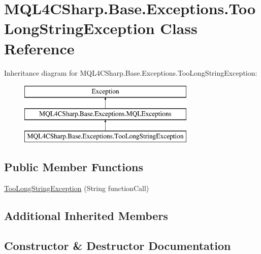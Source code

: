 \hypertarget{class_m_q_l4_c_sharp_1_1_base_1_1_exceptions_1_1_too_long_string_exception}{}\section{M\+Q\+L4\+C\+Sharp.\+Base.\+Exceptions.\+Too\+Long\+String\+Exception Class Reference}
\label{class_m_q_l4_c_sharp_1_1_base_1_1_exceptions_1_1_too_long_string_exception}
Inheritance diagram for M\+Q\+L4\+C\+Sharp.\+Base.\+Exceptions.\+Too\+Long\+String\+Exception\+:\begin{figure}[H]
\begin{center}
\leavevmode
\includegraphics[height=3.000000cm]{class_m_q_l4_c_sharp_1_1_base_1_1_exceptions_1_1_too_long_string_exception}
\end{center}
\end{figure}
\subsection*{Public Member Functions}
\begin{DoxyCompactItemize}
\item 
\hyperlink{class_m_q_l4_c_sharp_1_1_base_1_1_exceptions_1_1_too_long_string_exception_a8cab46c3de76c383c129472ed70b1b25}{Too\+Long\+String\+Exception} (String function\+Call)
\end{DoxyCompactItemize}
\subsection*{Additional Inherited Members}


\subsection{Constructor \& Destructor Documentation}
